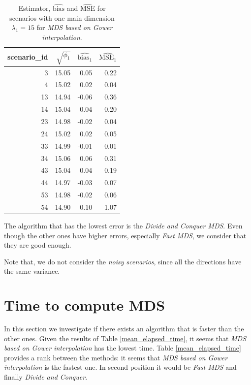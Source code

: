 \documentclass[11pt]{report}
\begin{document}
\begin{table}[ht]
\centering
\begin{tabular}{rrrr}
 scenario\_id & $\overline{\sqrt{\phi_1}}$ & $\widehat{\mbox{bias}_1}$ & $\widehat{\mbox{MSE}_1}$\\
  \hline
  3 & 15.05 & 0.05 & 0.22 \\ 
  4 & 15.02 & 0.02 & 0.04 \\ 
  13 & 14.94 & -0.06 & 0.36 \\ 
  14 & 15.04 & 0.04 & 0.20 \\ 
  23 & 14.98 & -0.02 & 0.04 \\ 
  24 & 15.02 & 0.02 & 0.05 \\ 
  33 & 14.99 & -0.01 & 0.01 \\ 
  34 & 15.06 & 0.06 & 0.31 \\ 
  43 & 15.04 & 0.04 & 0.19 \\ 
  44 & 14.97 & -0.03 & 0.07 \\ 
  53 & 14.98 & -0.02 & 0.06 \\ 
  54 & 14.90 & -0.10 & 1.07 \\ 
   \hline
\end{tabular}
\caption{Estimator, $\widehat{\mbox{bias}}$ and $\widehat{\mbox{MSE}}$ for scenarios with one main dimension $\lambda_1 = 15$ for \textit{MDS based on Gower interpolation}.}
\label{mse_gower_one_dimensions}
\end{table}

\indent The algorithm that has the lowest error is the 
\textit{Divide and Conquer MDS}. Even though the other ones have higher errors,
especially \textit{Fast MDS}, we consider that they are good enough.

\indent Note that, we do not consider the \textit{noisy scenarios}, since all 
the directions have the same variance.






\FloatBarrier

\section{Time to compute MDS}
In this section we investigate if there exists an algorithm that is faster than the
other ones. Given the results of Table \ref{mean_elapsed_time}, it seems that
\textit{MDS based on Gower interpolation} has the lowest time. Table 
\ref{mean_elapsed_time} provides a rank between the methods: 
it seems that \textit{MDS based on Gower interpolation} is the fastest one. 
In second position it would be \textit{Fast MDS} and finally 
\textit{Divide and Conquer}.
\end{document}

